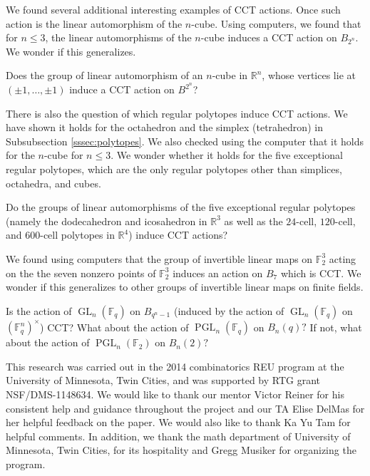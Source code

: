 \documentclass[smallextended, envcountsame, numbook]{svjour3}
\numberwithin{equation}{section}
\begin{document}
We found several additional interesting examples of CCT actions. Once such action is the linear automorphism of the $n$-cube. Using computers, we found that for $n \leq 3$, the linear automorphisms of the $n$-cube induces a CCT action on $B_{2^n}$. We wonder if this generalizes.

\begin{question}
\label{question:cube_cct}
Does the group of linear automorphism of an $n$-cube in $\mathbb R^n$, whose vertices lie at $(\pm 1, \ldots, \pm 1)$ induce a CCT action on $B^{2^n}$?
\end{question}

There is also the question of which regular polytopes induce CCT actions. We have shown it holds for the octahedron and the simplex (tetrahedron) in Subsubsection \ref{sssec:polytopes}. We also checked using the computer that it holds for the $n$-cube for $n \leq 3$. We wonder whether it holds for the five exceptional regular polytopes, which are the only regular polytopes other than simplices, octahedra, and cubes.

\begin{question}
\label{question:exceptional_polytopes_cct}
Do the groups of linear automorphisms of the five exceptional regular polytopes (namely the dodecahedron and icosahedron in $\mathbb R^3$ as well as the $24$-cell, $120$-cell, and $600$-cell polytopes in $\mathbb R^4$) induce CCT actions?
\end{question}

We found using computers that the group of invertible linear maps on $\mathbb F_2^3$ acting on the the seven nonzero points of $\mathbb F_2^3$ induces an action on $B_7$ which is CCT. We wonder if this generalizes to other groups of invertible linear maps on finite fields.

\begin{question}
Is the action of $\operatorname{GL}_n(\mathbb F_q)$ on $B_{q^n-1}$ (induced by the action of $\operatorname{GL}_n(\mathbb F_q)$ on $(\mathbb F_q^n)^\times$) CCT? What about the action of $\operatorname{PGL}_n(\mathbb F_q)$ on $B_n(q)?$ If not, what about the action of $\operatorname{PGL}_n(\mathbb F_2)$ on $B_n(2)?$ 
\end{question}

\begin{acknowledgements}
This research was carried out in the 2014 combinatorics REU program at the University of Minnesota, Twin Cities, and was supported by RTG grant NSF/DMS-1148634.
We would like to thank our mentor Victor Reiner for his consistent help and guidance throughout the project and our TA Elise DelMas for her helpful feedback on the paper. We would also like to thank Ka Yu Tam for helpful comments.  In addition, we thank the math department of University of Minnesota, Twin Cities, for its hospitality and Gregg Musiker for organizing the program.
\end{acknowledgements}
\end{document}
